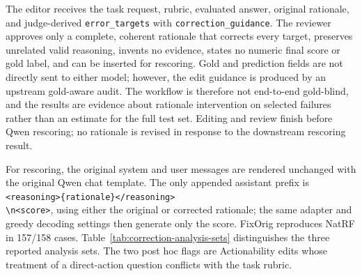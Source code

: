 The editor receives the task request, rubric, evaluated answer, original
rationale, and judge-derived \texttt{error\_targets} with
\texttt{correction\_guidance}. The reviewer approves only a complete,
coherent rationale that corrects every target, preserves unrelated valid
reasoning, invents no evidence, states no numeric final score or gold label,
and can be inserted for rescoring. Gold and prediction fields are not directly
sent to either model; however, the edit guidance is produced by an upstream
gold-aware audit. The workflow is therefore not end-to-end gold-blind, and
the results are evidence about rationale intervention on selected failures
rather than an estimate for the full test set. Editing and review finish
before Qwen rescoring; no rationale is revised in response to the downstream
rescoring result.

For rescoring, the original system and user messages are rendered unchanged
with the original Qwen chat template. The only appended assistant prefix is
\texttt{<reasoning>\{rationale\}</reasoning>}\\
\texttt{\textbackslash n<score>}, using either the
original or corrected rationale; the same adapter and greedy decoding settings
then generate only the score. FixOrig reproduces NatRF in 157/158 cases.
Table~\ref{tab:correction-analysis-sets} distinguishes the three reported
analysis sets. The two post hoc flags are Actionability edits whose treatment
of a direct-action question conflicts with the task rubric.

